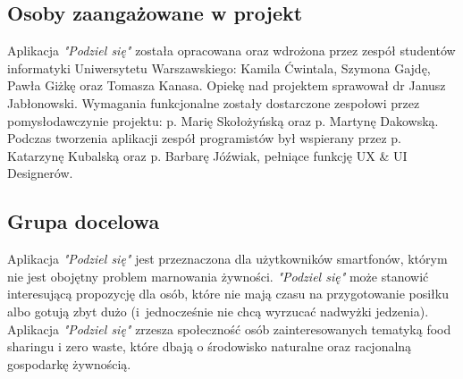 \documentclass[11pt]{article}
\begin{document}
\subsection*{Osoby zaangażowane w projekt}
Aplikacja \textit{"Podziel się"} została opracowana oraz wdrożona przez zespół studentów informatyki Uniwersytetu Warszawskiego: Kamila Ćwintala, Szymona Gajdę, Pawła Giżkę oraz Tomasza Kanasa. Opiekę nad projektem sprawował dr Janusz Jabłonowski. Wymagania funkcjonalne zostały dostarczone zespołowi przez pomysłodawczynie projektu: p. Marię Skołożyńską oraz p. Martynę Dakowską. Podczas tworzenia aplikacji zespół programistów był wspierany przez p. Katarzynę Kubalską oraz p. Barbarę Jóźwiak, pełniące funkcję UX \& UI Designerów.

\subsection*{Grupa docelowa}
Aplikacja \textit{"Podziel się"} jest przeznaczona dla użytkowników smartfonów, którym nie jest obojętny problem marnowania żywności. \textit{"Podziel się"} może stanowić interesującą propozycję dla osób, które nie mają czasu na przygotowanie posiłku albo gotują zbyt dużo (i~jednocześnie nie chcą wyrzucać nadwyżki jedzenia). Aplikacja \textit{"Podziel się"} zrzesza społeczność osób zainteresowanych tematyką food sharingu i zero waste, które dbają o środowisko naturalne oraz racjonalną gospodarkę żywnością.
\end{document}
